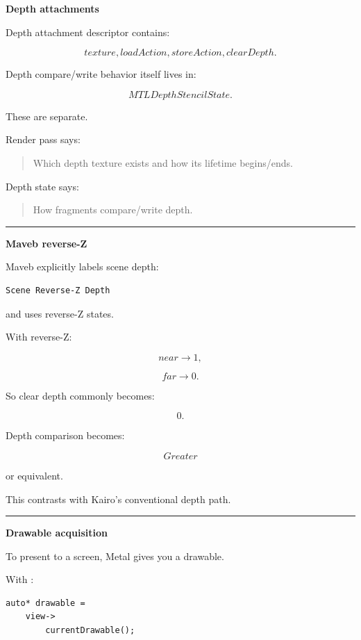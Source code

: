 \textbf{Depth attachments}

Depth attachment descriptor contains:

\[
texture,
loadAction,
storeAction,
clearDepth.
\]

Depth compare/write behavior itself lives in:

\[
MTLDepthStencilState.
\]

These are separate.

Render pass says:

\begin{quote}
Which depth texture exists and how its lifetime begins/ends.
\end{quote}

Depth state says:

\begin{quote}
How fragments compare/write depth.
\end{quote}

\begin{center}\rule{0.5\linewidth}{0.5pt}\end{center}

\textbf{Maveb reverse-Z}

Maveb explicitly labels scene depth:

\begin{verbatim}
Scene Reverse-Z Depth
\end{verbatim}

and uses reverse-Z states.

With reverse-Z:

\[
near\rightarrow1,
\]

\[
far\rightarrow0.
\]

So clear depth commonly becomes:

\[
0.
\]

Depth comparison becomes:

\[
Greater
\]

or equivalent.

This contrasts with Kairo's conventional depth path.

\begin{center}\rule{0.5\linewidth}{0.5pt}\end{center}

\textbf{Drawable acquisition}

To present to a screen, Metal gives you a drawable.

With :

\begin{verbatim}
auto* drawable =
    view->
        currentDrawable();
\end{verbatim}

